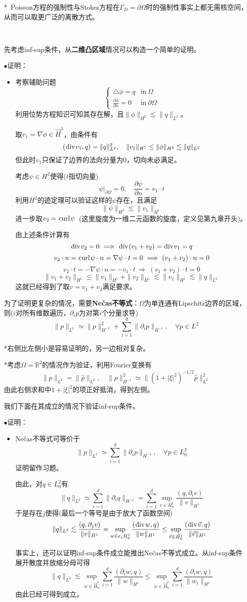 \documentclass[a4paper,UTF8,fontset=windows]{ctexart}
\renewcommand*{\div}{\hspace{0.07em}\mathrm{div}\hspace{0.07em}}
\newcommand*{\curl}{\hspace{0.07em}\mathrm{curl}\hspace{0.07em}}
\newcommand{\proo}[1]{{\kaishu $\bullet$证明：
\begin{itemize}
    \item[] #1
\end{itemize}
}}
\begin{document}
*\ Poisson方程的强制性与Stokes方程在$\Gamma_D=\partial\Omega$时的强制性事实上都无需核空间，从而可以取更广泛的离散方式。

\

先考虑inf-sup条件，从\textbf{二维凸区域}情况可以构造一个简单的证明。

\proo{
    考察辅助问题
    $$\begin{cases}\triangle\phi=q&\text{in}\ \Omega\\\frac{\partial\phi}{\partial n}=0&\text{in}\ \partial\Omega\end{cases}$$
    利用位势方程知识可知其存在解，且$\|\phi\|_{H^2}\lesssim\|q\|_{L^2}$。

    取$v_1=\nabla\phi\in\vec{H}^1$，由条件有
    $$(\div v_1,q)=\|q\|_{L^2}^2,\quad\|v_1\|_{H^1}\le\|\phi\|_{H^2}\lesssim\|q\|_{L^2}$$
    但此时$v_1$只保证了边界的法向分量为0，切向未必满足。

    考虑$\psi\in H^2$使得($t$指切向量)
    $$\psi\big|_{\partial\Omega}=0,\quad\frac{\partial\psi}{\partial n}=v_1\cdot t$$
    利用$H^2$的迹定理可以验证这样的$\psi$存在，且满足
    $$\|\psi\|_{H^2}\lesssim\|v_1\|_{H^1}$$
    进一步取$v_2=\curl\psi$\ (这里旋度为一维二元函数的旋度，定义见第九章开头)。

    由上述条件计算有
    $$\div v_2=0\ \Longrightarrow\ \div(v_1+v_2)=\div v_1=q$$
    $$v_2\cdot n=\curl\psi\cdot n=\nabla\psi\cdot t=0\ \Longrightarrow\ (v_1+v_2)\cdot n=0$$
    $$v_2\cdot t=-\nabla\psi\cdot n=-v_1\cdot t\ \Longrightarrow\ (v_1+v_2)\cdot t=0$$
    $$\|v_1+v_2\|_{H^1}\le\|v_1\|_{H^1}+\|v_2\|_{H^1}\lesssim\|v_1\|_{H^1}\lesssim\|q\|_{L^2}$$
    这就已经得到了取$v=v_1+v_2$满足要求。
}

为了证明更复杂的情况，需要\textbf{Ne\v cas不等式}：$\Omega$为单连通有Lipschitz边界的区域，则($i$对所有维数遍历，$\partial_ip$为对第$i$个分量求导)
$$\|p\|_{L^2}\simeq\|p\|_{H^{-1}}^2+\sum_{i=1}^d\|\partial_ip\|_{H^{-1}},\quad\forall p\in L^2$$

*右侧比左侧小是容易证明的，另一边相对复杂。

*考虑$\Omega=\mathbb{R}^2$的情况作为验证，利用Fourier变换有
$$\|p\|_{L^2}=\|\hat{p}\|_{L^2},\quad\|p\|_{H^{-1}}^2\simeq\|(1+|\xi|^2)^{-1/2}\hat{p}\|_{L^2}^2$$
由此右侧求和中$1+|\xi|^2$的项正好抵消，得到左侧。

我们下面在其成立的情况下验证inf-sup条件。

\proo{
    Ne\v cas不等式可等价于
    $$\|p\|_{L^2}\simeq\sum_{i=1}^d\|\partial_ip\|_{H^{-1}},\quad\forall p\in L_0^2$$
    证明留作习题。

    由此，对$q\in L_0^2$有
    $$\|q\|_{L^2}\simeq\sum_{i=1}^d\|\partial_iq\|_{H^{-1}}=\sum_{i=1}^d\sup_{v\in H_0^1}\frac{(q,\partial_iv)}{\|v\|_{H^1}}$$
    于是存在$j$使得(最后一个等号是由于放大了函数空间)
    $$\|q\|_{L^2}\lesssim\frac{(q,\partial_jv)}{\|v\|_{H^1}}=\sup_{w\in e_jH_0^1}\frac{(\div w,q)}{\|w\|_{H^1}}\le\sup_{\vec{v}\in\vec{H}_0^1}\frac{(\div\vec{v},q)}{\|\vec{v}\|_{H^1}}$$

    事实上，还可以证明inf-sup条件成立能推出Ne\v cas不等式成立。从inf-sup条件展开散度并放缩分母可得
    $$\|q\|_{L^2}\lesssim\sup_{w\in\vec{H}_0^1}\sum_{i=1}^d\frac{(\partial_iw,q)}{\|w\|_{H^1}}\le\sup_{w\in\vec{H}_0^1}\sum_{i=1}^d\frac{(\partial_iw,q)}{\|w_i\|_{H^1}}$$
    由此已经可得到成立。
}
\end{document}
